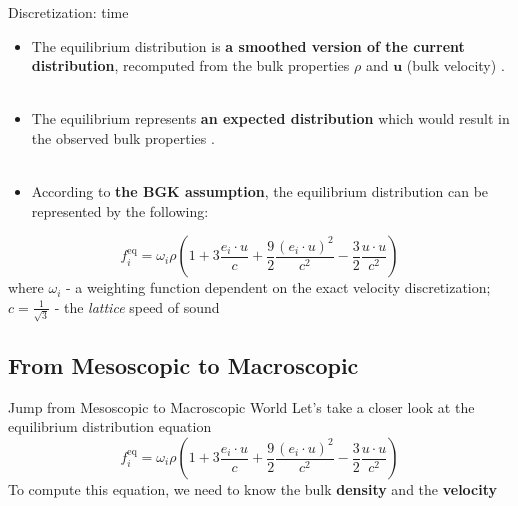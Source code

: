 \documentclass[9pt]{beamer}
\begin{document}
\begin{frame}[t]{Discretization: time}
\begin{itemize}
\item The equilibrium distribution is \textbf{a smoothed version of the current distribution}, recomputed from the bulk properties $\rho$ and $\textbf{u}$ (bulk velocity) \cite{lattice_boltzmann}. \\~\\

\item The equilibrium represents \textbf{an expected distribution} which would result in the observed bulk properties \cite{lattice_boltzmann}. \\~\\

\item According to \textbf{the BGK assumption}, the equilibrium distribution can be represented by the following:
\end{itemize}

\begin{equation*}
f_i^\text{eq} = \omega_i \rho \left(1 + 3\frac{e_i \cdot u}{c} + \frac92 \frac{(e_i \cdot u)^2}{c^2} - \frac32 \frac{u\cdot u}{c^2}\right)
\end{equation*}
where $\omega_i$ - a weighting function dependent on the exact velocity discretization; $c = \frac{1}{\sqrt{3}}$ - the \textit{lattice} speed of sound 
\end{frame}
\subsection{From Mesoscopic to Macroscopic}
\begin{frame}[t]{Jump from Mesoscopic to Macroscopic World}
Let's take a closer look at the equilibrium distribution equation
\begin{equation*}
f_i^\text{eq} = \omega_i \rho \left(1 + 3\frac{e_i \cdot u}{c} + \frac92 \frac{(e_i \cdot u)^2}{c^2} - \frac32 \frac{u\cdot u}{c^2}\right)
\end{equation*}
To compute this equation, we need to know the bulk \textbf{density} and the \textbf{velocity} 
\end{frame}
\end{document}
